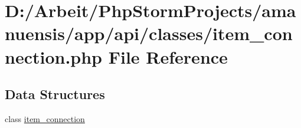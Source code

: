 \hypertarget{item__connection_8php}{}\section{D\+:/\+Arbeit/\+Php\+Storm\+Projects/amanuensis/app/api/classes/item\+\_\+connection.php File Reference}
\label{item__connection_8php}
\subsection*{Data Structures}
\begin{DoxyCompactItemize}
\item 
class \hyperlink{classitem__connection}{item\+\_\+connection}
\end{DoxyCompactItemize}
